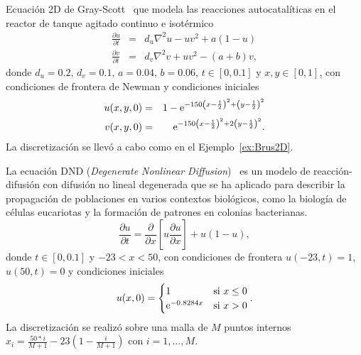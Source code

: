 \begin{example}\label{ex:GS2D}
    Ecuación 2D de Gray-Scott~\cite{gray1984autocatalytic,tokman2012new} que modela las reacciones autocatalíticas en el reactor de tanque agitado continuo e isotérmico
    \begin{eqnarray*}
        \frac{\partial u}{\partial t} &=& d_u\nabla^{2}u -uv^{2}+a(1-u) \\
        \frac{\partial v}{\partial t} &=& d_v\nabla^{2}v +uv^{2}-(a+b)v,
    \end{eqnarray*}
    donde $d_u=0\mathord{.}2,\,d_v=0\mathord{.}1,\,a=0\mathord{.}04,\,b=0\mathord{.}06$, $t\in[0, 0\mathord{.}1]$ y $x,y\in[0,1]$, con condiciones de frontera de Newman y condiciones iniciales
    \begin{eqnarray*}
        u(x,y,0) & = & 1-\mathrm{e}^{-150\left(x-\frac{1}{2}\right)^{2}+\left(y-\frac{1}{2}\right)^{2}}\\
        v(x,y,0) & = & \mathrm{e}^{-150\left(x-\frac{1}{2}\right)^{2}+2\left(y-\frac{1}{2}\right)^{2}}.
    \end{eqnarray*}
    La discretización se llevó a cabo como en el Ejemplo~\ref{ex:Brus2D}.
\end{example}

\begin{example}
    La ecuación DND (\emph{Degenerate Nonlinear Diffusion})~\cite{sherratt2010form,tokman2013comparative} es un modelo de reacción-difusión con difusión no lineal degenerada que se ha aplicado para describir la propagación de poblaciones en varios contextos biológicos, como la biología de células eucariotas y la formación de patrones en colonias bacterianas.
    \[ \frac{\partial u}{\partial t} = \frac{\partial}{\partial x}\left[ u\frac{\partial u}{\partial x} \right] + u(1-u), \]
    donde $t\in[0, 0\mathord{.}1]$ y $-23 < x < 50$, con condiciones de frontera $u(-23,t) = 1$, $u(50,t)=0$ y condiciones iniciales
    \[ u(x,0)=\begin{cases}
    1 & \text{si } x\leq 0\\
    \mathrm{e}^{-0\mathord{.}8284x} & \text{si } x>0
    \end{cases}. \]
    La discretización se realizó sobre una malla de $M$ puntos internos $x_i=\frac{50*i}{M+1}-23\left(1-\frac{i}{M+1}\right)$ con $i=1,\ldots,M$.
\end{example}


